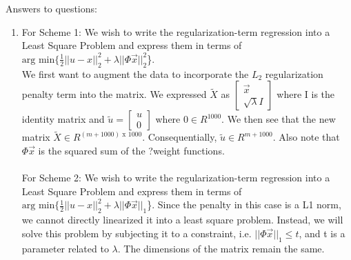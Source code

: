 \documentclass[a4paper]{article}
\begin{document}
Answers to questions:
\begin{enumerate}
\item  
\subitem For Scheme 1:
We wish to write the regularization-term regression into a Least Square Problem and express them in terms of $\text{arg min} \{ \frac{1}{2} || u - x||^2_2 + \lambda || \Phi \vec{x}||^2_2$\}. \\ We first want to augment the data to incorporate the $L_2$ regularization penalty term into the matrix.  We  expressed $\tilde{X}$ as $\begin{bmatrix}
\vec{x} \\ \sqrt{\lambda}I \end{bmatrix}$ where I is the identity matrix and $\tilde{u} = \begin{bmatrix}
u \\ 0 \end{bmatrix}$ where $0 \in R^{1000}$. We then see that the new matrix  $\tilde{X} \in R^{(m + 1000) \text{ x } 1000}$. Consequentially, $\tilde{u} \in R^{m + 1000}$. Also note that $\Phi\vec{x}$ is the squared sum of the ?weight functions. \\

\noindent{} \\ 

\subitem For Scheme 2: We wish to write the regularization-term regression into a Least Square Problem and express them in terms of $\text{arg min} \{ \frac{1}{2} || u - x||^2_2 + \lambda || \Phi \vec{x}||_1 $\}. Since the penalty in this case is a L1 norm, we cannot directly linearized it into a least square problem. Instead, we will solve this problem by subjecting it to a constraint, i.e. $||\Phi\vec{x}||_1 \leq t $, and t is a parameter related to $\lambda $. The dimensions of the matrix remain the same. \\




\end{enumerate}
\end{document}
